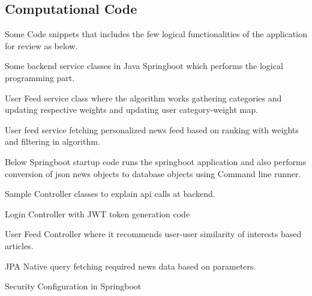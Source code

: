 \begin{appendices}



\chapter{Computational Code}
Some Code snippets that includes the few logical functionalities of the application for review as below.

Some backend service classes in Java Springboot which performs the logical programming part.

User Feed service class where the algorithm works gathering categories and updating respective weights and updating user category-weight map.



User feed service fetching personalized news feed based on ranking with weights and filtering in algorithm.

 

Below Springboot startup code runs the springboot application and also performs conversion of json news objects to database objects using Command line runner.


Sample Controller classes to explain api calls at backend.

Login Controller with JWT token generation code

 

User Feed Controller where it recommends user-user similarity of interests based articles.
 

JPA Native query fetching required news data based on parameters.
 

Security Configuration in Springboot
 


\end{appendices}
